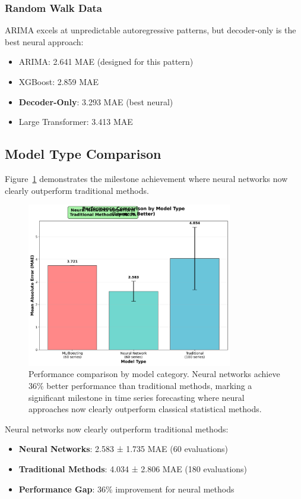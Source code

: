 \documentclass[11pt]{article}
\begin{document}
\subsubsection{Random Walk Data}

ARIMA excels at unpredictable autoregressive patterns, but decoder-only is the best neural approach:

\begin{itemize}
\item ARIMA: 2.641 MAE (designed for this pattern)
\item XGBoost: 2.859 MAE
\item \textbf{Decoder-Only}: 3.293 MAE (best neural)
\item Large Transformer: 3.413 MAE
\end{itemize}

\subsection{Model Type Comparison}

Figure~\ref{fig:model_type} demonstrates the milestone achievement where neural networks now clearly outperform traditional methods.

\begin{figure}[h]
\centering
\includegraphics[width=0.8\textwidth]{../results/figure4_model_type_comparison.png}
\caption{Performance comparison by model category. Neural networks achieve 36\% better performance than traditional methods, marking a significant milestone in time series forecasting where neural approaches now clearly outperform classical statistical methods.}
\label{fig:model_type}
\end{figure}

Neural networks now clearly outperform traditional methods:
\begin{itemize}
\item \textbf{Neural Networks}: 2.583 ± 1.735 MAE (60 evaluations)
\item \textbf{Traditional Methods}: 4.034 ± 2.806 MAE (180 evaluations)
\item \textbf{Performance Gap}: 36\% improvement for neural methods
\end{itemize}
\end{document}
